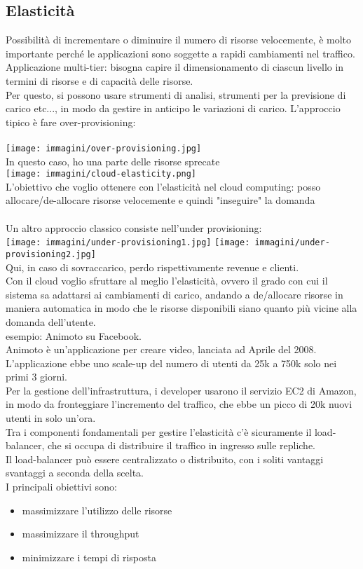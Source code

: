 \documentclass{article}
\begin{document}
\subsection{Elasticità}
Possibilità di incrementare o diminuire il numero di risorse velocemente, è molto importante perché le applicazioni sono soggette a rapidi cambiamenti nel traffico.\\ Applicazione multi-tier: bisogna capire il dimensionamento di ciascun livello in termini di risorse e di capacità delle risorse.\\ Per questo, si possono usare strumenti di analisi, strumenti per la previsione di carico etc..., in modo da gestire in anticipo le variazioni di carico. L'approccio tipico è fare over-provisioning: \\\\
\texttt{[image: immagini/over-provisioning.jpg]}\\
In questo caso, ho una parte delle risorse sprecate\\
\texttt{[image: immagini/cloud-elasticity.png]}
\\L'obiettivo che voglio ottenere con l'elasticità nel cloud computing: posso allocare/de-allocare risorse velocemente e quindi "inseguire" la domanda\\\\ Un altro approccio classico consiste nell'under provisioning:\\
\texttt{[image: immagini/under-provisioning1.jpg]}
\texttt{[image: immagini/under-provisioning2.jpg]}\\
Qui, in caso di sovraccarico, perdo rispettivamente revenue e clienti.\\ Con il cloud voglio sfruttare al meglio l'elasticità, ovvero il grado con cui il sistema sa adattarsi ai cambiamenti di carico, andando a de/allocare risorse in maniera automatica in modo che le risorse disponibili siano quanto più vicine alla domanda dell'utente.\\
esempio: Animoto su Facebook.\\
Animoto è un'applicazione per creare video, lanciata ad Aprile del 2008. L'applicazione ebbe uno scale-up del numero di utenti da 25k a 750k solo nei primi 3 giorni.\\ Per la gestione dell'infrastruttura, i developer usarono il servizio EC2 di Amazon, in modo da fronteggiare l'incremento del traffico, che ebbe un picco di 20k nuovi utenti in solo un'ora.\\ Tra i componenti fondamentali per gestire l'elasticità c'è sicuramente il load-balancer, che si occupa di distribuire il traffico in ingresso sulle repliche.\\ Il load-balancer può essere centralizzato o distribuito, con i soliti vantaggi  svantaggi a seconda della scelta.\\ I principali obiettivi sono:
\begin{itemize}
\item massimizzare l'utilizzo delle risorse
\item massimizzare il throughput
\item minimizzare i tempi di risposta
\end{itemize}
\end{document}
